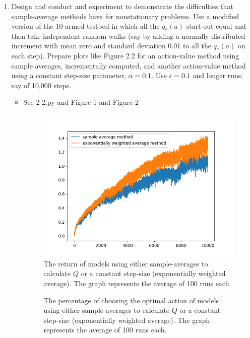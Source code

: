 \documentclass{article}
\begin{document}
\begin{enumerate}
    \item Design and conduct and experiment to demonstrate the difficulties that sample-average methods have for nonstationary problems. Use a modified version of the 10-armed testbed in which all the $q_*(a)$ start out equal and then take independent random walks (say by adding a normally distributed increment with mean zero and standard deviation 0.01 to all the $q_*(a)$ on each step). Prepare plots like Figure 2.2 for an action-value method using sample averages, incrementally computed, and another action-value method using a constant step-size parameter, $\alpha=0.1$. Use $\epsilon=0.1$ and longer runs, say of 10,000 steps.
    \begin{itemize}
        \item See 2-2.py and Figure 1 and Figure 2 
        \begin{figure}[ht]
            \caption{The return of models using either sample-averages to calculate $Q$ or a constant step-size (exponentially weighted average). The graph represents the average of 100 runs each.}
            \centering
            \includegraphics[scale=0.75]{figure-1.png}
        \end{figure}
        \begin{figure}[ht]
            \caption{The percentage of choosing the optimal action of models using either sample-averages to calculate $Q$ or a constant step-size (exponentially weighted average). The graph represents the average of 100 runs each.}
            \centering

\end{figure}
\end{itemize}
\end{enumerate}
\end{document}
